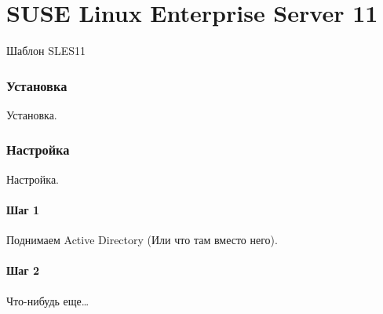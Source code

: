\part{SUSE Linux Enterprise Server 11}
Шаблон SLES11

\section{Установка}
Установка.

\section{Настройка}
Настройка.

\subsection{Шаг 1}
Поднимаем Active Directory (Или что там вместо него).

\subsection{Шаг 2}
Что-нибудь еще\ldots